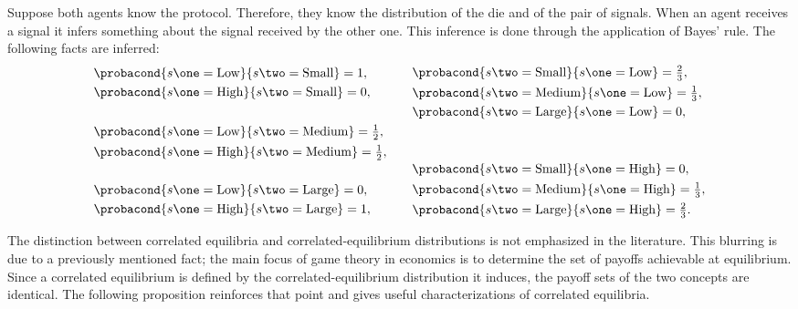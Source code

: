 \begin{example}
Suppose both agents know the protocol.
Therefore, they know the distribution of the die and of the pair of signals.
When an agent receives a signal it infers something about the signal received by the other one.
This inference is done through the application of Bayes' rule.
The following facts are inferred:
\begin{equation*}
\begin{split}
&\probacond{s\one = \mathrm{Low}}{s\two = \mathrm{Small}} = 1, \\
&\probacond{s\one = \mathrm{High}}{s\two = \mathrm{Small}} = 0, \\
\\
&\probacond{s\one = \mathrm{Low}}{s\two = \mathrm{Medium}} = \tfrac{1}{2}, \\
&\probacond{s\one = \mathrm{High}}{s\two = \mathrm{Medium}} = \tfrac{1}{2}, \\
\\
&\probacond{s\one = \mathrm{Low}}{s\two = \mathrm{Large}} = 0, \\
&\probacond{s\one = \mathrm{High}}{s\two = \mathrm{Large}} = 1, \\
\end{split}
\qquad
\begin{split}
&\probacond{s\two = \mathrm{Small}}{s\one = \mathrm{Low}} = \tfrac{2}{3}, \\
&\probacond{s\two = \mathrm{Medium}}{s\one = \mathrm{Low}} = \tfrac{1}{3}, \\
&\probacond{s\two = \mathrm{Large}}{s\one = \mathrm{Low}} = 0, \\
\\
\\
&\probacond{s\two = \mathrm{Small}}{s\one = \mathrm{High}} = 0, \\
&\probacond{s\two = \mathrm{Medium}}{s\one = \mathrm{High}} = \tfrac{1}{3}, \\
&\probacond{s\two = \mathrm{Large}}{s\one = \mathrm{High}} = \tfrac{2}{3}.
\end{split}
\end{equation*}

\end{example}

The distinction between correlated equilibria and correlated-equilibrium distributions is not emphasized in the literature.
This blurring is due to a previously mentioned fact; the main focus of game theory in economics is to determine the set of payoffs achievable at equilibrium.
Since a correlated equilibrium is defined by the correlated-equilibrium distribution it induces, the payoff sets of the two concepts are identical.
The following proposition reinforces that point and gives useful characterizations of correlated equilibria.

